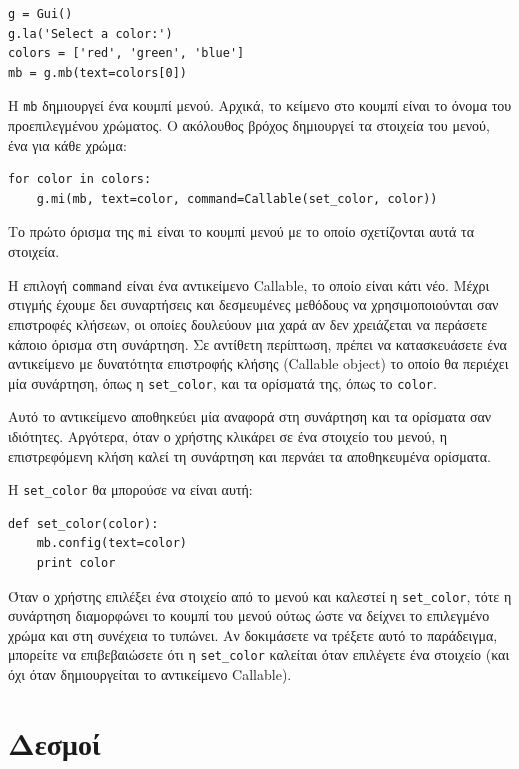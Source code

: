 \documentclass[10pt]{book}
\begin{document}
\begin{verbatim}
g = Gui()
g.la('Select a color:')
colors = ['red', 'green', 'blue']
mb = g.mb(text=colors[0])
\end{verbatim}
%
Η {\tt mb} δημιουργεί ένα κουμπί μενού.  Αρχικά, το κείμενο στο κουμπί είναι το 
όνομα του προεπιλεγμένου χρώματος.  Ο ακόλουθος βρόχος δημιουργεί τα στοιχεία του μενού,
ένα για κάθε χρώμα: 

\begin{verbatim}
for color in colors:
    g.mi(mb, text=color, command=Callable(set_color, color))
\end{verbatim}
%
Το πρώτο όρισμα της {\tt mi} είναι το κουμπί μενού με το οποίο σχετίζονται 
αυτά τα στοιχεία.

Η επιλογή {\tt command} είναι ένα αντικείμενο Callable, το οποίο είναι 
κάτι νέο.  Μέχρι στιγμής έχουμε δει συναρτήσεις και δεσμευμένες μεθόδους να χρησιμοποιούνται 
σαν επιστροφές κλήσεων, οι οποίες δουλεύουν μια χαρά αν δεν χρειάζεται να περάσετε κάποιο όρισμα 
στη συνάρτηση.  Σε αντίθετη περίπτωση, πρέπει να κατασκευάσετε ένα αντικείμενο με δυνατότητα 
επιστροφής κλήσης (Callable object) το οποίο θα περιέχει μία συνάρτηση, όπως η
\verb"set_color", και τα ορίσματά της, όπως το {\tt color}.

Αυτό το αντικείμενο αποθηκεύει μία αναφορά στη συνάρτηση και τα ορίσματα σαν ιδιότητες.  
Αργότερα, όταν ο χρήστης κλικάρει σε ένα στοιχείο του μενού, η επιστρεφόμενη κλήση καλεί τη 
συνάρτηση και περνάει τα αποθηκευμένα ορίσματα.

Η \verb"set_color" θα μπορούσε να είναι αυτή:

\begin{verbatim}
def set_color(color):
    mb.config(text=color)
    print color
\end{verbatim}
%
Όταν ο χρήστης επιλέξει ένα στοιχείο από το μενού και καλεστεί η \verb"set_color", τότε η
συνάρτηση διαμορφώνει το κουμπί του μενού ούτως ώστε να δείχνει το επιλεγμένο χρώμα και στη 
συνέχεια το τυπώνει.  Αν δοκιμάσετε να τρέξετε αυτό το παράδειγμα, μπορείτε να επιβεβαιώσετε
ότι η \verb"set_color" καλείται όταν επιλέγετε ένα στοιχείο (και όχι όταν δημιουργείται το αντικείμενο
Callable).



\section{Δεσμοί}
\end{document}

